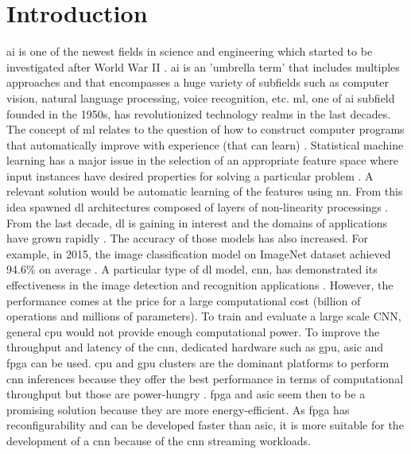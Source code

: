 \chapter{Introduction} \label{chap:intr}
%
\acrfull{ai} is one of the newest fields in science and engineering which started to be investigated  after World War II \cite{russell_artificial_2009}. \acrshort{ai} is an 'umbrella term' that includes multiples approaches and that encompasses a huge variety of subfields such as computer vision, natural language processing, voice recognition, etc.
\acrfull{ml}, one of \acrshort{ai} subfield founded in the 1950s, has revolutionized technology realms in the last decades. The concept of \acrshort{ml} relates to the question of how to construct computer programs that automatically improve with experience (that can learn) \cite{mitchell_machine_1997}.
Statistical machine learning has a major issue in the selection of an appropriate feature space where input instances have desired properties for solving a particular problem \cite{arnold_introduction_2011}. A relevant solution would be automatic learning of the features using \acrfull{nn}. From this idea spawned \acrfull{dl} architectures composed of layers of non-linearity processings \cite{alom_history_2018}. From the last decade, \acrshort{dl} is gaining in interest and the domains of applications have grown rapidly \cite{wason_deep_2018}. The accuracy of those models has also increased. For example, in 2015, the image classification model on ImageNet dataset achieved 94.6\% on average \cite{russakovsky_imagenet_2015}.\newline \newline
%
A particular type of \acrshort{dl} model, \acrfull{cnn}, has demonstrated its effectiveness in the image detection and recognition applications \cite{shawahna_fpga-based_2019}. However, the performance comes at the price for a large computational cost (billion of operations and millions of parameters). To train and evaluate a large scale CNN, general \acrfull{cpu} would not provide enough computational power. To improve the throughput and latency of the \acrshort{cnn}, dedicated hardware such as \acrfull{gpu}, \acrfull{asic} and \acrfull{fpga} can be used. \acrshort{cpu} and \acrshort{gpu} clusters are the dominant platforms to perform \acrshort{cnn} inferences because they offer the best performance in terms of computational throughput but those are power-hungry \cite{liu_uniform_2019}.
\acrshort{fpga} and \acrshort{asic} seem then to be a promising solution because they are more energy-efficient. As \acrshort{fpga} has reconfigurability and can be developed faster than \acrshort{asic}, it is more suitable for the development of a \acrshort{cnn} because of the \acrshort{cnn} streaming workloads. \newline \newline
